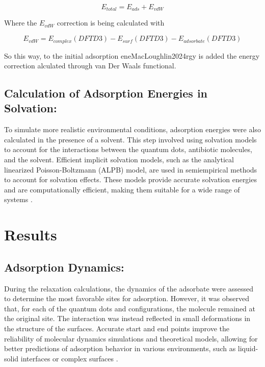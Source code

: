 \documentclass[preprint,12pt]{elsarticle}
\begin{document}
	\begin{equation} E_{total} = E_{ads} + E_{vdW} \end{equation}
	
	Where the $E_{vdW}$ correction is being calculated with
	
	\begin{equation} E_{vdW} = E_{complex}(DFTD3) - E_{surf}(DFTD3) - E_{adsorbate}(DFTD3) \end{equation}
	
	So this way, to the initial adsorption eneMacLoughlin2024rgy is added the energy correction alculated through van Der Waals functional.
	
	\subsection{Calculation of Adsorption Energies in Solvation:} To simulate more realistic environmental conditions, adsorption energies were also calculated in the presence of a solvent. This step involved using solvation models to account for the interactions between the quantum dots, antibiotic molecules, and the solvent. Efficient implicit solvation models, such as the analytical linearized Poisson-Boltzmann (ALPB) model, are used in semiempirical methods to account for solvation effects. These models provide accurate solvation energies and are computationally efficient, making them suitable for a wide range of systems \cite{Ehlert2021Robust}.
	
	
	\section{Results}
	
	\subsection{Adsorption Dynamics:} During the relaxation calculations, the dynamics of the adsorbate were assessed to determine the most favorable sites for adsorption. However, it was observed that, for each of the quantum dots and configurations, the molecule remained at the original site. The interaction was instead reflected in small deformations in the structure of the surfaces. Accurate start and end points improve the reliability of molecular dynamics simulations and theoretical models, allowing for better predictions of adsorption behavior in various environments, such as liquid-solid interfaces or complex surfaces \cite{Ivanova2024Study} \cite{Cazzaniga2020Anharmonic}.
	
\end{document}
